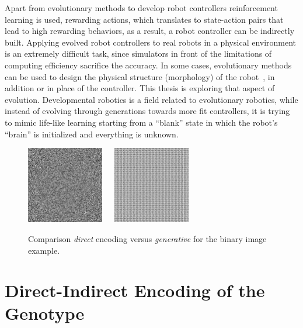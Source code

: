 Apart from evolutionary methods to develop robot controllers reinforcement learning is used, rewarding actions, which translates to state-action pairs that lead to high rewarding behaviors, as a result, a robot controller can be indirectly built. Applying evolved robot controllers to real robots in a physical environment is an extremely difficult task, since simulators in front of the limitations of computing efficiency sacrifice the accuracy. In some cases, evolutionary methods can be used to design the physical structure (morphology) of the robot~\cite{hiller2010evolving}, in addition or in place of the controller. This thesis is exploring that aspect of evolution. Developmental robotics is a field related to evolutionary robotics,  while instead of evolving through generations towards more fit controllers, it is trying to mimic life-like learning starting from a ``blank'' state in which the robot's ``brain'' is initialized and everything is unknown.

\begin{figure}[t!]
\centering
\includegraphics[width=0.3\textwidth]{../Figures/Misc/direct.jpg}\  \   \   
\includegraphics[width=0.3\textwidth]{../Figures/Misc/indirect.jpg}
\caption{Comparison \emph{direct} encoding versus \emph{generative} for the binary image example.}
\label{fig:directVsIndirectEncoding}
\end{figure}


\section{Direct-Indirect Encoding of the Genotype}


